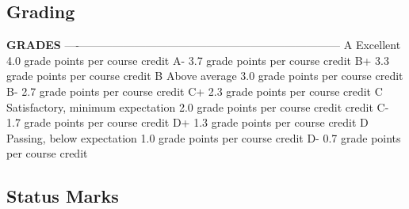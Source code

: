 \documentclass[
  letterpaper,
]{scrbook}
\begin{document}
\subsection{Grading}\label{grading}

\textbf{GRADES} \textbar{} \textbar{} \textbar{} \textbar{}
\textbar----\textbar-----------------------------------\textbar------------------------------------\textbar{}
\textbar{} A \textbar{} Excellent \textbar{} 4.0 grade points per course
credit \textbar{} \textbar{} A- \textbar{} \textbar{} 3.7 grade points
per course credit \textbar{} \textbar{} B+ \textbar{} \textbar{} 3.3
grade points per course credit \textbar{} \textbar{} B \textbar{} Above
average \textbar{} 3.0 grade points per course credit \textbar{}
\textbar{} B- \textbar{} \textbar{} 2.7 grade points per course credit
\textbar{} \textbar{} C+ \textbar{} \textbar{} 2.3 grade points per
course credit \textbar{} \textbar{} C \textbar{} Satisfactory, minimum
expectation \textbar{} 2.0 grade points per course credit \textbar{}
\textbar{} \textbar{} credit \textbar{} \textbar{} \textbar{} C-
\textbar{} \textbar{} 1.7 grade points per course credit \textbar{}
\textbar{} D+ \textbar{} \textbar{} 1.3 grade points per course credit
\textbar{} \textbar{} D \textbar{} Passing, below expectation \textbar{}
1.0 grade points per course credit \textbar{} \textbar{} D- \textbar{}
\textbar{} 0.7 grade points per course credit \textbar{}

\subsection{Status Marks}\label{status-marks}
\end{document}
